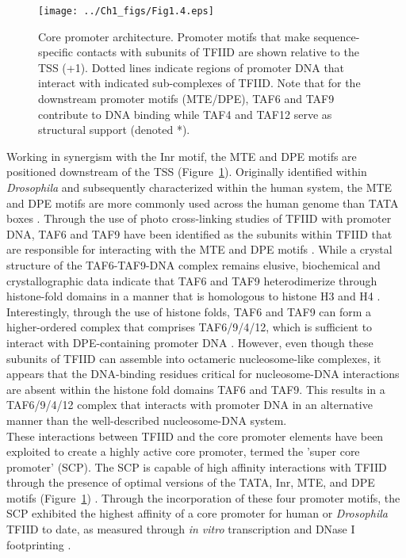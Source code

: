 \begin{figure}
\centering
\texttt{[image: ../Ch1\_figs/Fig1.4.eps]}
\caption[Core promoter architecture]{Core promoter architecture. Promoter motifs that make sequence-specific contacts with subunits of TFIID are shown relative to the TSS (+1).  Dotted lines indicate regions of promoter DNA that interact with indicated sub-complexes of TFIID.  Note that for the downstream promoter motifs (MTE/DPE), TAF6 and TAF9 contribute to DNA binding while TAF4 and TAF12 serve as structural support (denoted *).}
\label{fig:Fig1.4}
\end{figure}
\indent Working in synergism with the Inr motif, the MTE and DPE motifs are positioned downstream of the TSS (Figure~\ref{fig:Fig1.4}). Originally identified within \emph{Drosophila} and subsequently characterized within the human system, the MTE and DPE motifs are more commonly used across the human genome than TATA boxes \cite{Kim_1387}. Through the use of photo cross-linking studies of TFIID with promoter DNA, TAF6 and TAF9  have been identified as the subunits within TFIID that are responsible for interacting with the MTE and DPE motifs \cite{Burke_2739,Lim_1522}. While a crystal structure of the TAF6-TAF9-DNA complex remains elusive, biochemical and crystallographic data indicate that TAF6 and TAF9 heterodimerize through histone-fold domains in a manner that is homologous to histone H3 and H4 \cite{Hoffmann_2911,Xie_2805}. Interestingly, through the use of histone folds, TAF6 and TAF9 can form a higher-ordered complex that comprises TAF6/9/4/12, which is sufficient to interact with DPE-containing promoter DNA \cite{Shao_1340}. However, even though these subunits of TFIID can assemble into octameric nucleosome-like complexes, it appears that the DNA-binding residues critical for nucleosome-DNA interactions are absent within the histone fold domains TAF6 and TAF9. This results in a TAF6/9/4/12 complex that interacts with promoter DNA in an alternative manner than the well-described nucleosome-DNA system.\\
\indent These interactions between TFIID and the core promoter elements have been exploited to create a highly active core promoter, termed the 'super core promoter' (SCP). The SCP is capable of high affinity interactions with TFIID through the presence of optimal versions of the TATA, Inr, MTE, and DPE motifs (Figure~\ref{fig:Fig1.4}) \cite{Juven-Gershon_1249}. Through the incorporation of these four promoter motifs, the SCP exhibited the highest affinity of a core promoter for human or \emph{Drosophila} TFIID to date, as measured through \emph{in vitro} transcription and DNase I footprinting \cite{Juven-Gershon_1249}. 

